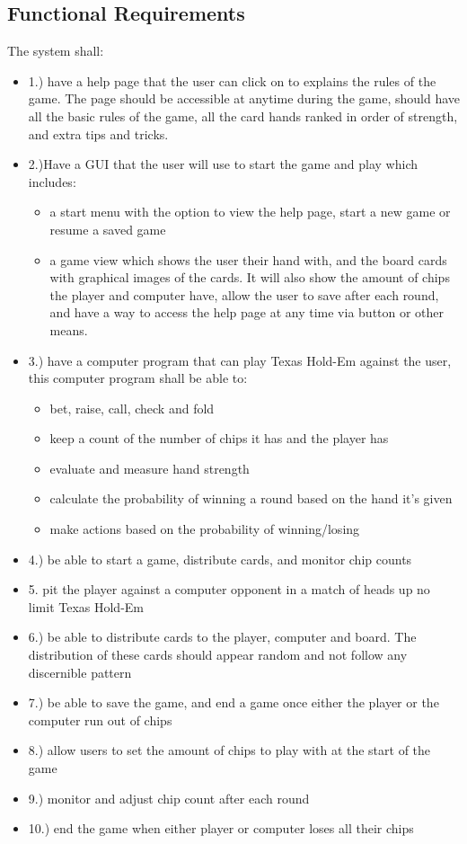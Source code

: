 \documentclass[12pt]{article}
\begin{document}
	\subsection{Functional Requirements}
	The system shall:
	\begin{itemize}
	\item 1.) have a help page that the user can click on to explains the rules of the game. The page should be accessible at anytime during the game, should have all the basic rules of the game, all the card hands ranked in order of strength, and extra tips and tricks.
	\item 2.)Have a GUI that the user will use to start the game and play which includes:
	\begin{itemize}
	\item a start menu with the option to view the help page, start a new game or resume a saved game
	\item a game view which shows the user their hand with, and the board cards with graphical images of the cards. It will also show the amount of chips the player and computer have, allow the user to save after each round, and have a way to access the help page at any time via button or other means. 
	\end{itemize}
	\item 3.) have a computer program that can play Texas Hold-Em against the user, this computer program shall be able to:
	\begin{itemize}
	\item	bet, raise, call, check and fold
	\item 	keep a count of the number of chips it has and the player has
	\item 	evaluate and measure hand strength
	\item	calculate the probability of winning a round based on the hand it’s given
	\item 	make actions based on the probability of winning/losing
	\end{itemize}
	\item 4.) be able to start a game, distribute cards, and monitor chip counts
	\item 5. pit the player against a computer opponent in a match of heads up no limit 					Texas Hold-Em
	\item 6.) be able to distribute cards to the player, computer and board. The distribution of these cards should appear random and not follow any discernible pattern
	\item 7.) be able to save the game, and end a game once either the player or the computer 			run out of chips
	\item 8.) allow users to set the amount of chips to play with at the start of the game
	\item 9.) monitor and adjust chip count after each round
	\item 10.) end the game when either player or computer loses all their chips
	\end{itemize}
	
\end{document}
